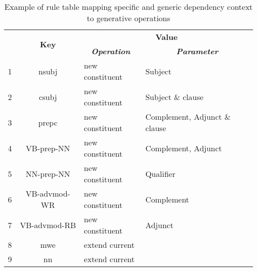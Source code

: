     \begin{table}[!ht]
    	\centering
    	\begin{tabular}{|l|c|l|l|}
    		\hline
    		\multirow{2}{*}{} & \multirow{2}{*}{\textbf{Key}} & \multicolumn{2}{c|}{\textbf{Value}}                                                                 \\ \cline{3-4} 
    		&                               & \multicolumn{1}{c|}{\textit{\textbf{Operation}}} & \multicolumn{1}{c|}{\textit{\textbf{Parameter}}} \\ \hline
    		1                 & nsubj                         & new constituent                                 & Subject                                          \\ \hline
    		2                 & csubj                         & new constituent                         & Subject \& clause                                          \\ \hline
    		3                 & prepc                         & new constituent                         & Complement, Adjunct \& clause                             \\ \hline
    		4                 & VB-prep-NN                    & new constituent                                 & Complement, Adjunct                              \\ \hline
    		5                 & NN-prep-NN                    & new constituent                                 & Qualifier                                        \\ \hline
    		6                 & VB-advmod-WR                  & new constituent                                 & Complement                                       \\ \hline
    		7                 & VB-advmod-RB                  & new constituent                                 & Adjunct                                          \\ \hline
    		8                 & mwe                           & extend current                                  &                                                  \\ \hline
    		9                 & nn                            & extend current                                  &                                                  \\ \hline
    	\end{tabular}
    	\caption{Example of rule table mapping specific and generic dependency context to generative operations}
    	\label{tab:rule-table}
    \end{table}

